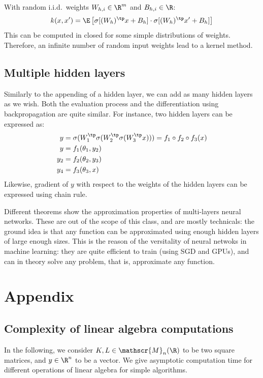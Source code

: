 \documentclass[toc, titlepaged]{../cs-classes/cs-classes}
\begin{document}
With random i.i.d.~weights $W_{h, i}\in\R^m$ and $B_{h, i}\in\R$:
\begin{equation*}
    k(x, x') = \E\left[\sigma[(W_h)^\tp x+B_h]\cdot \sigma[(W_h)^\tp x' + B_h]\right]
\end{equation*}
This can be computed in closed for some simple distributions of weights. Therefore, an infinite number of random input weights lead to a kernel method.

\subsection{Multiple hidden layers}
Similarly to the appending of a hidden layer, we can add as many hidden layers as we wish. Both the evaluation process and the differentiation using backpropagation are quite similar. For instance, two hidden layers can be expressed as:
\begin{equation*}
    \begin{aligned}
        y &= \sigma(W_1^\tp \sigma(W_2^\tp \sigma(W_3^\tp x))) = f_1\circ f_2\circ f_3(x)\\
        y &= f_1(\theta_1, y_2)\\
        y_2 &= f_2(\theta_2, y_3)\\
        y_4 &= f_3(\theta_3, x)
    \end{aligned}
\end{equation*}
Likewise, gradient of $y$ with respect to the weights of the hidden layers can be expressed using chain rule.

Different theorems show the approximation properties of multi-layers neural networks. These are out of the scope of this class, and are mostly technicals: the ground idea is that any function can be approximated using enough hidden layers of large enough sizes. This is the reason of the versitality of neural netwoks in machine learning: they are quite efficient to train (using SGD and GPUs), and can in theory solve any problem, that is, approximate any function.

\section{Appendix}
\subsection{Complexity of linear algebra computations}
In the following, we consider $K, L\in\mathscr{M}_n(\R)$ to be two square matrices, and $y\in\R^n$ to be a vector. We give asymptotic computation time for different operations of linear algebra for simple algorithms.
\end{document}
